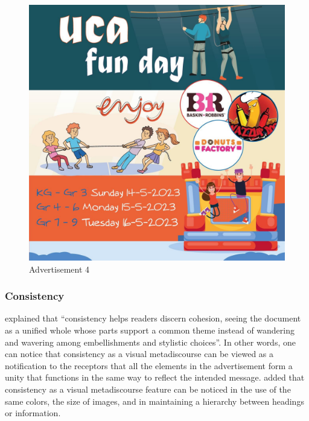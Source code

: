 \documentclass[english]{textolivre}
\begin{document}
\begin{figure}[htbp]
\centering
\begin{minipage}{0.5\textwidth}
\includegraphics[width=\linewidth]{Fig4.png}
\caption{Advertisement 4}
\label{fig4}
\end{minipage}
\end{figure}

\subsubsection{Consistency}\label{sec-autores}
\textcite[p.~412]{kumpf_visual_2000} explained that “consistency helps readers discern cohesion, seeing the document as a unified whole whose parts support a common theme instead of wandering and wavering among embellishments and stylistic choices”. In other words, one can notice that consistency as a visual metadiscourse can be viewed as a notification to the receptors that all the elements in the advertisement form a unity that functions in the same way to reflect the intended message. \textcite{al-subhi_metadiscourse_2022} added that consistency as a visual metadiscourse feature can be noticed in the use of the same colors, the size of images, and in maintaining a hierarchy between headings or information. 
\end{document}
